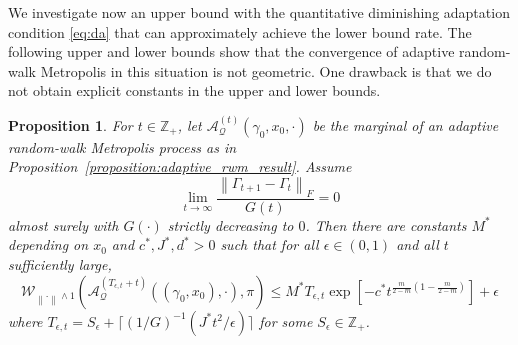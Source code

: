 \documentclass[12pt]{article}
\theoremstyle{plain}
\newtheorem{proposition}[theorem]{Proposition}
\theoremstyle{remark}
\newcommand{\norm}[1]{\left\lVert#1\right\rVert}
\newcommand{\e}{\epsilon}
\newcommand{\Z}{\mathbb{Z}}
\newcommand{\Q}{\mathcal{Q}}
\newcommand{\W}{\mathcal{W}}
\newcommand{\A}{\mathcal{A}}
\begin{document}
We investigate now an upper bound with the quantitative diminishing adaptation condition \eqref{eq:da} that can approximately achieve the lower bound rate.
The following upper and lower bounds show that the convergence of adaptive random-walk Metropolis in this situation is not geometric.
One drawback is that we do not obtain explicit constants in the upper and lower bounds.

\begin{proposition}
For $t \in \Z_+$, let $\A_{\Q}^{(t)}(\gamma_0, x_0, \cdot)$ be the marginal of an adaptive random-walk Metropolis process as in Proposition~\ref{proposition:adaptive_rwm_result}.
Assume
\[
\lim_{t \to \infty} \frac{ \norm{ \Gamma_{t + 1} - \Gamma_t }_F }{ G(t) }
= 0
\]
almost surely with $G(\cdot)$ strictly decreasing to $0$.
Then there are constants $M^*$ depending on $x_0$ and $c^*, J^*, d^* > 0$ such that for all $\e \in (0, 1)$ and all $t$ sufficiently large,
\[
\W_{\norm{\cdot} \wedge 1}\left( \A_{\Q}^{(T_{\e, t} + t)}((\gamma_0, x_0), \cdot), \pi \right)
\le M^* T_{\e, t}
 \exp\left[ -c^* t^{\frac{m}{2-m} \left( 1 - \frac{m}{2-m} \right)} \right]
 + \e
\]
where $T_{\e, t} = S_{\e} + \lceil (1/G)^{-1}\left( J^* t^2 / \e \right) \rceil$ for some $S_{\e} \in \Z_+$.
\end{proposition}
\end{document}
